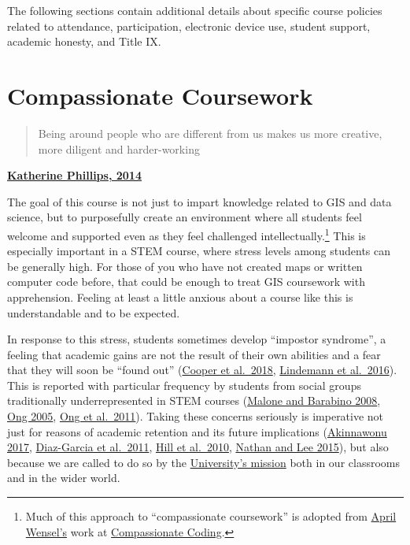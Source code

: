 \documentclass[]{book}
\begin{document}
The following sections contain additional details about specific course policies related to attendance, participation, electronic device use, student support, academic honesty, and Title IX.

\hypertarget{compassionate-coursework}{%
\section{Compassionate Coursework}\label{compassionate-coursework}}

\begin{quote}
Being around people who are different from us makes us more creative, more diligent and harder-working
\end{quote}

\textbf{\href{https://www.scientificamerican.com/article/how-diversity-makes-us-smarter/}{Katherine Phillips, 2014}}

The goal of this course is not just to impart knowledge related to GIS and data science, but to purposefully create an environment where all students feel welcome and supported even as they feel challenged intellectually.\footnote{Much of this approach to ``compassionate coursework'' is adopted from \href{https://twitter.com/aprilwensel}{April Wensel's} work at \href{https://compassionatecoding.com}{Compassionate Coding}.} This is especially important in a STEM course, where stress levels among students can be generally high. For those of you who have not created maps or written computer code before, that could be enough to treat GIS coursework with apprehension. Feeling at least a little anxious about a course like this is understandable and to be expected.

In response to this stress, students sometimes develop ``impostor syndrome'', a feeling that academic gains are not the result of their own abilities and a fear that they will soon be ``found out'' (\href{https://www.physiology.org/doi/10.1152/advan.00085.2017}{Cooper et al.~2018}, \href{http://genderandset.open.ac.uk/index.php/genderandset/article/view/435}{Lindemann et al.~2016}). This is reported with particular frequency by students from social groups traditionally underrepresented in STEM courses (\href{https://onlinelibrary.wiley.com/doi/pdf/10.1002/sce.20307}{Malone and Barabino 2008}, \href{https://doi.org/10.1525/sp.2005.52.4.593}{Ong 2005}, \href{https://doi.org/10.17763/haer.81.2.t022245n7x4752v2}{Ong et al.~2011}). Taking these concerns seriously is imperative not just for reasons of academic retention and its future implications (\href{https://open.nytimes.com/why-having-a-diverse-team-will-make-your-products-better-c73e7518f677}{Akinnawonu 2017}, \href{https://www.tandfonline.com/doi/abs/10.5172/impp.2013.15.2.149}{Diaz-Garcia et al.~2011}, \href{https://www.aauw.org/aauw_check/pdf_download/show_pdf.php?file=why-so-few-research}{Hill et al.~2010}, \href{https://www.tandfonline.com/doi/abs/10.1111/ecge.12016}{Nathan and Lee 2015}), but also because we are called to do so by the \href{https://www.slu.edu/about/catholic-jesuit-identity/mission.php}{University's mission} both in our classrooms and in the wider world.
\end{document}
